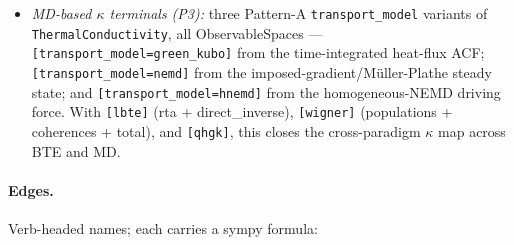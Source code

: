 \documentclass[11pt,a4paper]{article}
\begin{document}
\begin{itemize}[leftmargin=2em, itemsep=0.2em]
        the diffusion-limit observable.
  \item \emph{MD-based $\kappa$ terminals (P3):} three Pattern-A
        \texttt{transport\_model} variants of \texttt{ThermalConductivity}, all
        ObservableSpaces --- \texttt{[transport\_model=green\_kubo]} from the
        time-integrated heat-flux ACF; \texttt{[transport\_model=nemd]} from
        the imposed-gradient/Müller-Plathe steady state; and
        \texttt{[transport\_model=hnemd]} from the homogeneous-NEMD driving
        force. With \texttt{[lbte]} (rta + direct\_inverse), \texttt{[wigner]}
        (populations + coherences + total), and \texttt{[qhgk]}, this closes
        the cross-paradigm $\kappa$ map across BTE and MD.
\end{itemize}

\paragraph{Edges.} Verb-headed names; each carries a sympy formula:
\end{document}
